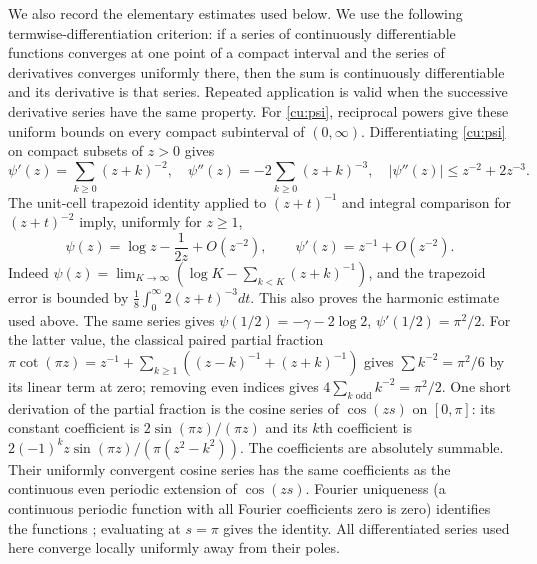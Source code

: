 We also record the elementary estimates used below.
We use the following termwise-differentiation criterion: if a series of
continuously differentiable functions converges at one point of a compact
interval and the series of derivatives converges uniformly there, then
the sum is continuously differentiable and its derivative is that series.
Repeated application is valid when the successive derivative series have
the same property. For \eqref{cu:psi}, reciprocal powers give these uniform
bounds on every compact subinterval of $(0,\infty)$.
Differentiating
\eqref{cu:psi} on compact subsets of $z>0$ gives
\[
 \psi'(z)=\sum_{k\geq0}(z+k)^{-2},\quad
 \psi''(z)=-2\sum_{k\geq0}(z+k)^{-3},\quad
 |\psi''(z)|\leq z^{-2}+2z^{-3}.
\]
The unit-cell trapezoid identity applied to $(z+t)^{-1}$ and integral
comparison for $(z+t)^{-2}$ imply, uniformly for $z\geq1$,
\begin{equation}\label{cu:psi-est}
 \psi(z)=\log z-\frac1{2z}+O(z^{-2}),\qquad
 \psi'(z)=z^{-1}+O(z^{-2}).
\end{equation}
Indeed $\psi(z)=\lim_{K\to\infty}(\log K-\sum_{k<K}(z+k)^{-1})$,
and the trapezoid error is bounded by $\tfrac18\int_0^\infty
2(z+t)^{-3}dt$. This also proves the harmonic estimate used above.
The same series gives
$\psi(1/2)=-\gamma-2\log2$, $\psi'(1/2)=\pi^2/2$.
For the latter value, the classical paired partial fraction
$\pi\cot(\pi z)=z^{-1}+\sum_{k\geq1}((z-k)^{-1}+(z+k)^{-1})$
gives $\sum k^{-2}=\pi^2/6$ by its linear term at zero; removing even
indices gives $4\sum_{k\text{ odd}}k^{-2}=\pi^2/2$.
One short derivation of the partial fraction is the cosine series of
$\cos(zs)$ on $[0,\pi]$: its constant coefficient is
$2\sin(\pi z)/(\pi z)$ and its $k$th coefficient is
$2(-1)^kz\sin(\pi z)/(\pi(z^2-k^2))$. The coefficients are absolutely
summable. Their uniformly convergent cosine series has the same
coefficients as the continuous even periodic extension of $\cos(zs)$.
Fourier uniqueness (a continuous periodic function with all Fourier
coefficients zero is zero) identifies the functions
\cite[Chapter~I]{Katznelson2004}; evaluating at $s=\pi$ gives the identity. All differentiated
series used here converge locally uniformly away from their poles.


